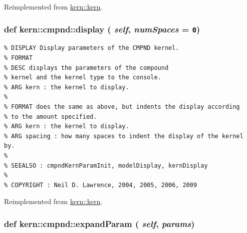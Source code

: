 Reimplemented from \hyperlink{classkern_1_1kern}{kern::kern}.\hypertarget{classkern_1_1cmpnd_5f0881b786c5ffcf0262732c8f119d1a}{
\subsubsection[{display}]{\setlength{\rightskip}{0pt plus 5cm}def kern::cmpnd::display ( {\em self}, \/   {\em numSpaces} = {\tt 0})}}
\label{classkern_1_1cmpnd_5f0881b786c5ffcf0262732c8f119d1a}




\footnotesize\begin{verbatim}% DISPLAY Display parameters of the CMPND kernel.
% FORMAT
% DESC displays the parameters of the compound
% kernel and the kernel type to the console.
% ARG kern : the kernel to display.
%
% FORMAT does the same as above, but indents the display according
% to the amount specified.
% ARG kern : the kernel to display.
% ARG spacing : how many spaces to indent the display of the kernel by.
%
% SEEALSO : cmpndKernParamInit, modelDisplay, kernDisplay
%
% COPYRIGHT : Neil D. Lawrence, 2004, 2005, 2006, 2009

\end{verbatim}
\normalsize
 

Reimplemented from \hyperlink{classkern_1_1kern}{kern::kern}.\hypertarget{classkern_1_1cmpnd_4fa764e9b24f54a8eb3ee05f07983452}{
\subsubsection[{expandParam}]{\setlength{\rightskip}{0pt plus 5cm}def kern::cmpnd::expandParam ( {\em self}, \/   {\em params})}}
\label{classkern_1_1cmpnd_4fa764e9b24f54a8eb3ee05f07983452}




